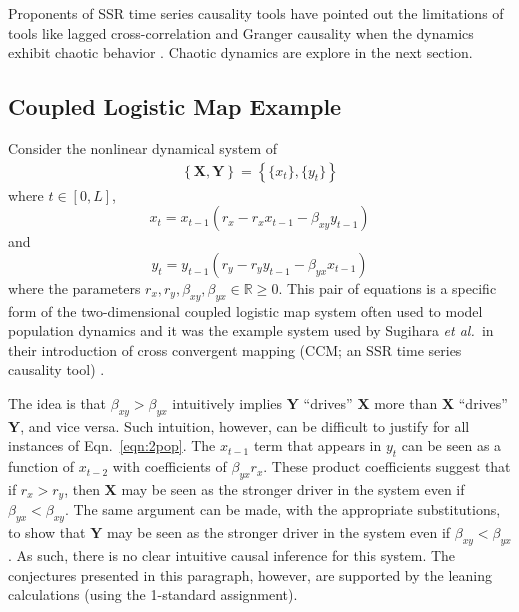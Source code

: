 \documentclass[twocolumn,aps,pre,groupedaddress]{revtex4-1}
\begin{document}
Proponents of SSR time series causality tools have pointed out the limitations of tools like lagged cross-correlation and Granger causality when the dynamics exhibit chaotic behavior \cite{Sugihara2012}.  Chaotic dynamics are explore in the next section.

\subsection{Coupled Logistic Map Example}
\label{sec:2Pop}
Consider the nonlinear dynamical system of
\begin{eqnarray}
\label{eqn:2pop}
\left\{\mathbf{X},\mathbf{Y}\right\} = \left\{\{x_t\},\{y_t\}\right\}
\end{eqnarray}
where $t\in[0,L]$,
\begin{equation*}
x_t = x_{t-1}\left(r_x-r_x x_{t-1}-\beta_{xy} y_{t-1}\right)
\end{equation*}
and
\begin{equation*}
y_t = y_{t-1}\left(r_y-r_y y_{t-1}-\beta_{yx} x_{t-1}\right)
\end{equation*}
where the parameters $r_x,r_y,\beta_{xy},\beta_{yx}\in\mathbb{R}\ge 0$.  This pair of equations is a specific form of the two-dimensional coupled logistic map system often used to model population dynamics \cite{Lloyd1995} and it was the example system used by Sugihara {\em et al.\ }in their introduction of cross convergent mapping (CCM; an SSR time series causality tool) \cite{Sugihara2012}.

The idea is that $\beta_{xy}>\beta_{yx}$ intuitively implies $\mathbf{Y}$ ``drives'' $\mathbf{X}$ more than $\mathbf{X}$ ``drives'' $\mathbf{Y}$, and vice versa.  Such intuition, however, can be difficult to justify for all instances of Eqn.\ \ref{eqn:2pop}.  The $x_{t-1}$ term that appears in $y_t$ can be seen as a function of $x_{t-2}$ with coefficients of $\beta_{yx}r_x$.  These product coefficients suggest that if $r_x>r_y$, then $\mathbf{X}$ may be seen as the stronger driver in the system even if $\beta_{yx}<\beta_{xy}$.  The same argument can be made, with the appropriate substitutions, to show that $\mathbf{Y}$ may be seen as the stronger driver in the system even if $\beta_{xy}<\beta_{yx}$.  As such, there is no clear intuitive causal inference for this system.  The conjectures presented in this paragraph, however, are supported by the leaning calculations (using the 1-standard assignment).
\end{document}
